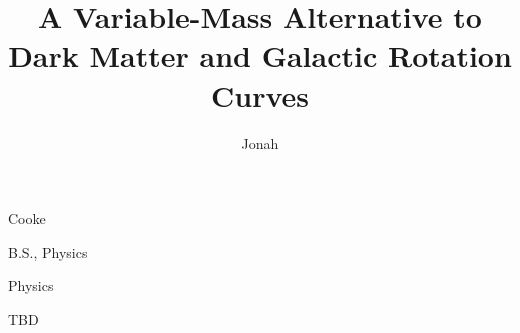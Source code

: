 %
%



\title{A Variable-Mass Alternative to Dark Matter and Galactic Rotation Curves}

\author{Jonah}      %
  {Cooke}           %

  {B.S., Physics}            %

  {Physics}          %

\otherdegrees{~} %

  {TBD}             %

\abstract{ \OnePageChapter

}

\dedication[Dedication]{
  For whom it may concern.
}


\ToCisShort
\LoFisShort
\LoTisShort










\begin{singlespacing}
\printbibliography[
  title={References},
  heading=bibintoc,
]
\end{singlespacing}


